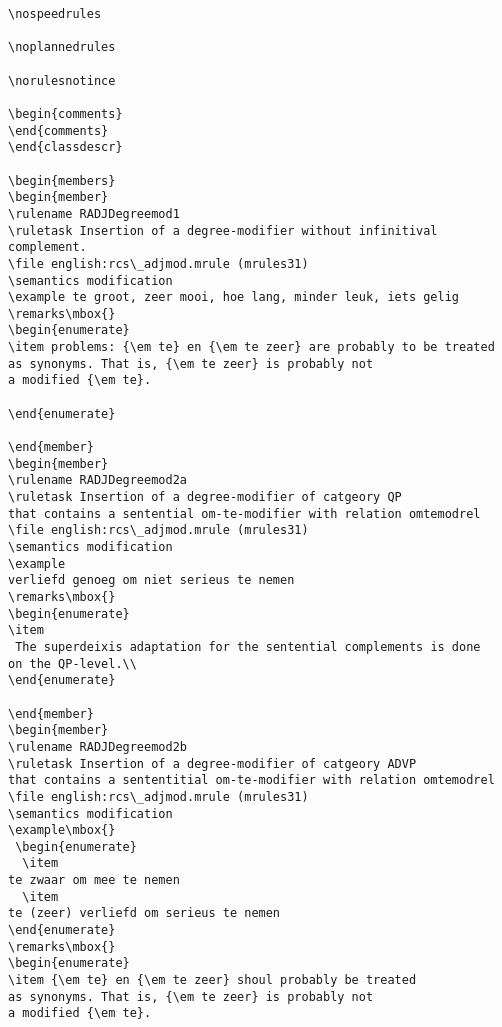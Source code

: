 \begin{verbatim}
\nospeedrules

\noplannedrules

\norulesnotince

\begin{comments}
\end{comments}
\end{classdescr}

\begin{members}
\begin{member}
\rulename RADJDegreemod1
\ruletask Insertion of a degree-modifier without infinitival complement.
\file english:rcs\_adjmod.mrule (mrules31)
\semantics modification
\example te groot, zeer mooi, hoe lang, minder leuk, iets gelig
\remarks\mbox{}
\begin{enumerate}
\item problems: {\em te} en {\em te zeer} are probably to be treated
as synonyms. That is, {\em te zeer} is probably not
a modified {\em te}.

\end{enumerate}

\end{member}
\begin{member}
\rulename RADJDegreemod2a
\ruletask Insertion of a degree-modifier of catgeory QP 
that contains a sentential om-te-modifier with relation omtemodrel
\file english:rcs\_adjmod.mrule (mrules31)
\semantics modification 
\example
verliefd genoeg om niet serieus te nemen
\remarks\mbox{}
\begin{enumerate}
\item 
 The superdeixis adaptation for the sentential complements is done
on the QP-level.\\
\end{enumerate}

\end{member}
\begin{member}
\rulename RADJDegreemod2b
\ruletask Insertion of a degree-modifier of catgeory ADVP
that contains a sententitial om-te-modifier with relation omtemodrel
\file english:rcs\_adjmod.mrule (mrules31)
\semantics modification
\example\mbox{}
 \begin{enumerate}
  \item 
te zwaar om mee te nemen
  \item
te (zeer) verliefd om serieus te nemen
\end{enumerate}
\remarks\mbox{}
\begin{enumerate}
\item {\em te} en {\em te zeer} shoul probably be treated
as synonyms. That is, {\em te zeer} is probably not
a modified {\em te}.


\end{verbatim}
